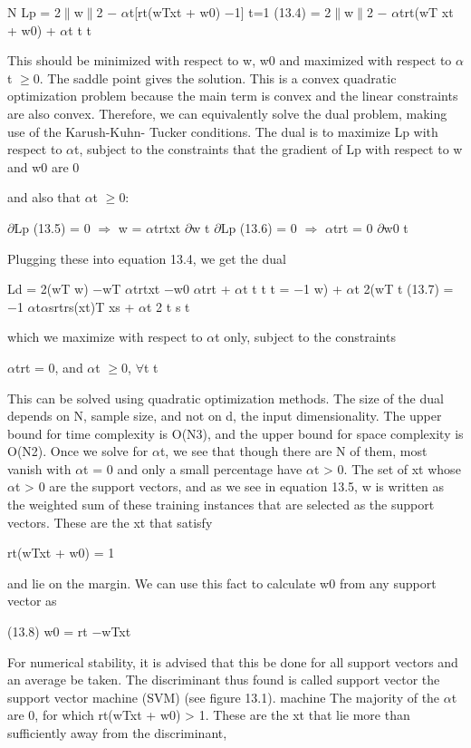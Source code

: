N Lp = 2$\parallel$w$\parallel$2 $-$ $\alpha$t[rt(wTxt + w0) $-$1] t=1 (13.4) = 2$\parallel$w$\parallel$2 $-$ $\alpha$trt(wT xt + w0) + $\alpha$t t t

This should be minimized with respect to w, w0 and maximized with respect to $\alpha$t $\geq$0. The saddle point gives the solution. This is a convex quadratic optimization problem because the main term is convex and the linear constraints are also convex. Therefore, we can equivalently solve the dual problem, making use of the Karush-Kuhn- Tucker conditions. The dual is to maximize Lp with respect to $\alpha$t, subject to the constraints that the gradient of Lp with respect to w and w0 are 0

and also that $\alpha$t $\geq$0:

$\partial$Lp (13.5) = 0 $\Rightarrow$ w = $\alpha$trtxt $\partial$w t $\partial$Lp (13.6) = 0 $\Rightarrow$ $\alpha$trt = 0 $\partial$w0 t

Plugging these into equation 13.4, we get the dual

Ld = 2(wT w) $-$wT $\alpha$trtxt $-$w0 $\alpha$trt + $\alpha$t t t t = $-$1 w) + $\alpha$t 2(wT t (13.7) = $-$1 $\alpha$t$\alpha$srtrs(xt)T xs + $\alpha$t 2 t s t

which we maximize with respect to $\alpha$t only, subject to the constraints

$\alpha$trt = 0, and $\alpha$t $\geq$0, $\forall$t t

This can be solved using quadratic optimization methods. The size of the dual depends on N, sample size, and not on d, the input dimensionality. The upper bound for time complexity is O(N3), and the upper bound for space complexity is O(N2). Once we solve for $\alpha$t, we see that though there are N of them, most vanish with $\alpha$t = 0 and only a small percentage have $\alpha$t > 0. The set of xt whose $\alpha$t > 0 are the support vectors, and as we see in equation 13.5, w is written as the weighted sum of these training instances that are selected as the support vectors. These are the xt that satisfy

rt(wTxt + w0) = 1

and lie on the margin. We can use this fact to calculate w0 from any support vector as

(13.8) w0 = rt $-$wTxt

For numerical stability, it is advised that this be done for all support vectors and an average be taken. The discriminant thus found is called support vector the support vector machine (SVM) (see figure 13.1). machine The majority of the $\alpha$t are 0, for which rt(wTxt + w0) > 1. These are the xt that lie more than sufficiently away from the discriminant,


